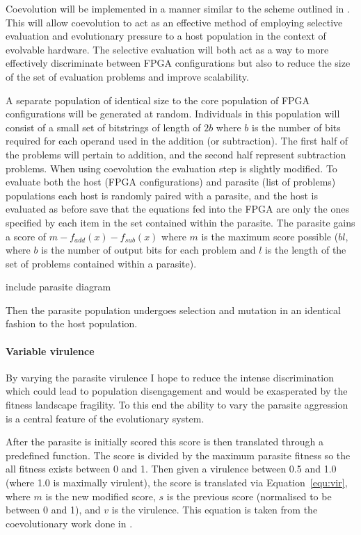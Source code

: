 Coevolution will be implemented in a manner similar to the scheme outlined in
\cite{6790490}.
This will allow coevolution to act as an effective method of employing selective
evaluation and evolutionary pressure to a host population in the context of
evolvable hardware. The selective evaluation will both act as a way to more effectively
discriminate between FPGA configurations but also to reduce the size of the
set of evaluation problems and improve scalability.

A separate population of identical size to the core population of FPGA configurations
will be generated at random. Individuals in this population will consist of a small set
of bitstrings of length of $2b$ where $b$ is the number of bits required for
each operand used in the addition (or subtraction). The first half of the problems
will pertain to addition, and the second half represent subtraction problems.
When using coevolution the
evaluation step is slightly modified. To evaluate both the host (FPGA
configurations) and parasite (list of problems) populations each host is randomly
paired with a parasite, and the host is evaluated as before save that the equations
fed into the FPGA are only the ones specified by each item in the set contained within
the parasite. The parasite gains a score of $m - f_{add}(x) - f_{sub}(x)$ where
$m$ is the maximum score possible ($bl$, where $b$ is the number of output bits for
each problem and $l$ is the length of the set of problems contained within a
parasite).

\todo include parasite diagram

Then the parasite population undergoes selection and mutation in an identical
fashion to the host population.

\paragraph{Variable virulence}
By varying the parasite virulence I hope to reduce the intense discrimination
which could lead to population disengagement and would be exasperated by the
fitness landscape fragility. To this end the ability to vary the parasite
aggression is a central feature of the evolutionary system.

After the parasite is initially scored this score is then translated through
a predefined function. The score is divided by the maximum parasite fitness so
the all fitness exists between 0 and 1. Then given a virulence
between 0.5 and 1.0 (where 1.0 is maximally virulent), the score is translated
via Equation~\ref{equ:vir}, where $m$ is the new modified score, $s$ is the
previous score (normalised to be between 0 and 1), and $v$ is the virulence.
This equation is taken from the coevolutionary work done in \cite{6790490}.

